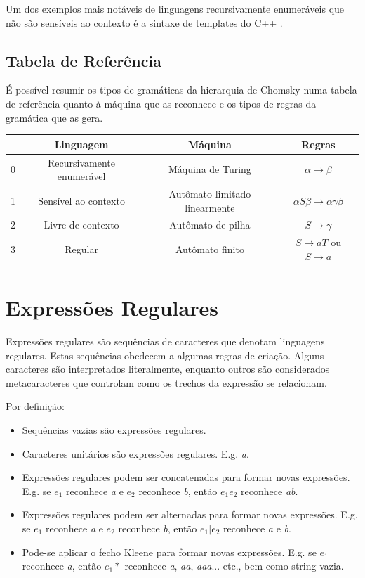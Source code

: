 \documentclass[a4paper,12pt,oneside,onecolumn]{uerj}
\begin{document}
Um dos exemplos mais notáveis de linguagens recursivamente enumeráveis que não são sensíveis ao contexto é a sintaxe de templates do C++ \cite{bib:Veldhuizen03}.

\subsection{Tabela de Referência}

É possível resumir os tipos de gramáticas da hierarquia de Chomsky numa tabela de referência quanto à máquina que as reconhece e os tipos de regras da gramática que as gera.

\begin{center}
	\begin{tabular}{ c | c | c | c }
		 & {\bf Linguagem} & {\bf Máquina} & {\bf Regras} \\
		\hline 
		0 & Recursivamente enumerável & Máquina de Turing 			 & 
			$\alpha \rightarrow \beta$ \\ 
		1 & Sensível ao contexto 		& Autômato limitado linearmente & 
			$\alpha S\beta\rightarrow \alpha\gamma\beta$\\ 
		2 & Livre de contexto 			& Autômato de pilha 			 & 
			$S \rightarrow \gamma$\\ 
		3 & Regular 					& Autômato finito 				 &
			$S \rightarrow aT$ ou $S \rightarrow a$\\ 
	\end{tabular}
\end{center}

\section{Expressões Regulares}

Expressões regulares são sequências de caracteres que denotam linguagens regulares. Estas sequências obedecem a algumas regras de criação. Alguns caracteres são interpretados literalmente, enquanto outros são considerados metacaracteres que controlam como os trechos da expressão se relacionam.

Por definição:

\begin{itemize}
    \item Sequências vazias são expressões regulares.
    \item Caracteres unitários são expressões regulares. E.g. \emph{a}.
    \item Expressões regulares podem ser concatenadas para formar novas expressões. E.g. se $e_1$ reconhece \emph{a} e $e_2$ reconhece \emph{b}, então $e_1e_2$ reconhece \emph{ab}.
    \item Expressões regulares podem ser alternadas para formar novas expressões. E.g. se $e_1$ reconhece \emph{a} e $e_2$ reconhece \emph{b}, então $e_1|e_2$ reconhece \emph{a} e \emph{b}.
    \item Pode-se aplicar o fecho Kleene para formar novas expressões. E.g. se $e_1$ reconhece \emph{a}, então $e_1*$ reconhece \emph{a}, \emph{aa}, \emph{aaa}... etc., bem como string vazia.
\end{itemize}
\end{document}
